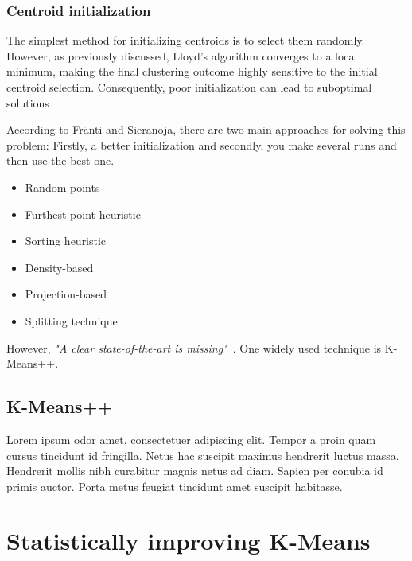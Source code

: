 \documentclass[10pt,twocolumn,letterpaper]{article}
\begin{document}

\subsubsection{Centroid initialization}

The simplest method for initializing centroids is to select them randomly.
However, as previously discussed, Lloyd’s algorithm converges to a local
minimum, making the final clustering outcome highly sensitive to the initial
centroid selection. Consequently, poor initialization can lead to suboptimal
solutions~\cite{FRANTI201995,Abdullah10601123}.

According to Fränti and Sieranoja\cite{FRANTI201995}, there are two main
approaches for solving this problem: Firstly, a better initialization and
secondly, you make several runs and then use the best one.
\begin{itemize}
    \item Random points
    \item Furthest point heuristic
    \item Sorting heuristic
    \item Density-based
    \item Projection-based
    \item Splitting technique
\end{itemize}
However, \textit{"A clear state-of-the-art is missing"}~\cite{FRANTI201995}. One widely used technique is K-Means++.

\subsection{K-Means++}\label{subsec:k-means++}

Lorem ipsum odor amet, consectetuer adipiscing elit. Tempor a proin quam cursus
tincidunt id fringilla. Netus hac suscipit maximus hendrerit luctus massa.
Hendrerit mollis nibh curabitur magnis netus ad diam. Sapien per conubia id
primis auctor. Porta metus feugiat tincidunt amet suscipit habitasse.


\section{Statistically improving K-Means}\label{sec:statistically-improving-k-means}
\end{document}
